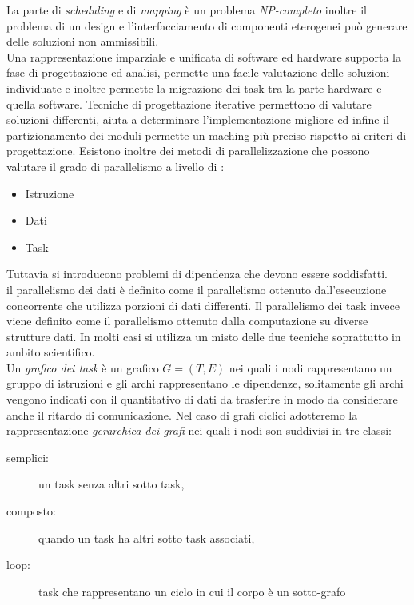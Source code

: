La parte di \emph{scheduling} e di \emph{mapping} è un problema \emph{NP-completo} inoltre il problema di un design e l'interfacciamento di componenti eterogenei può generare delle soluzioni non ammissibili.\\
Una rappresentazione imparziale e unificata di software ed hardware supporta la fase di progettazione ed analisi, permette una facile valutazione delle soluzioni individuate e inoltre permette la migrazione dei task tra la parte hardware e quella software. Tecniche di progettazione iterative permettono di valutare soluzioni differenti, aiuta a determinare l'implementazione migliore ed infine il partizionamento dei moduli permette un maching più preciso rispetto ai criteri di progettazione. Esistono inoltre dei metodi di parallelizzazione che possono valutare il grado di parallelismo a livello di :
\begin{itemize}
\item Istruzione
\item Dati 
\item Task
\end{itemize}
Tuttavia si introducono problemi di dipendenza che devono essere soddisfatti.\\
il parallelismo dei dati è definito come il parallelismo ottenuto dall'esecuzione concorrente che utilizza porzioni di dati differenti.
Il parallelismo dei task invece viene definito come il parallelismo ottenuto dalla computazione su diverse strutture dati.
In molti casi si utilizza un misto delle due tecniche soprattutto in ambito scientifico.\\
Un \emph{grafico dei task} è un grafico $G=(T,E)$ nei quali i nodi rappresentano un gruppo di istruzioni e gli archi rappresentano le dipendenze, solitamente gli archi vengono indicati con il quantitativo di dati da trasferire in modo da considerare anche il ritardo di comunicazione.
Nel caso di grafi ciclici adotteremo la rappresentazione \emph{gerarchica dei grafi} nei quali i nodi son suddivisi in tre classi:
\begin{description}
\item[semplici:] un task senza altri sotto task,
\item[composto:] quando un task ha altri sotto task associati,
\item[loop:] task che rappresentano un ciclo in cui il corpo è un sotto-grafo
\end{description}